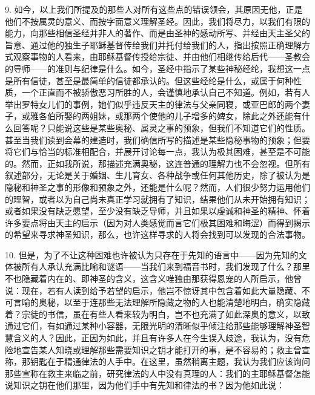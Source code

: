 9. 如今，以上我们所提及的那些人对所有这些点的错误领会，其原因无他，正是他们不按属灵的意义、而按字面意义理解圣经。因此，我们将尽力，以我们有限的能力，向那些相信圣经并非人的著作、而是由圣神的感动所写、并经由天主圣父的旨意、通过他的独生子耶稣基督传给我们并托付给我们的人，指出按照正确理解方式观察事物的人看来，由耶稣基督传授给宗徒、并由他们相继传给后代——圣教会的导师——的准则与纪律是什么。如今，圣经中指示了某些神秘经纶，我想这一点是所有信徒，甚至是最简单的信徒都承认的。但这些经纶是什么，或属于何种性质，一个正直而不被骄傲恶习所胜的人，会谨慎地承认自己不知道。例如，若有人举出罗特女儿们的事例，她们似乎违反天主的律法与父亲同寝，或亚巴郎的两个妻子，或雅各伯所娶的两姐妹，或那两个使他的儿子增多的婢女，除此之外还能有什么回答呢？只能说这些是某些奥秘、属灵之事的预象，但我们不知道它们的性质。甚至当我们读到会幕的建造时，我们确信所写的描述是某些隐秘事物的预象；但要将它们与恰当的标准相配合，并展开讨论每一点，我认为极其困难，甚至是不可能的。然而，正如我所说，那描述充满奥秘，这连普通的理解力也不会忽视。但所有叙述部分，无论是关于婚姻、生儿育女、各种战争或任何其他历史，除了被认为是隐秘和神圣之事的形像和预象之外，还能是什么呢？然而，人们很少努力运用他们的理智，或者以为自己尚未真正学习就拥有了知识，结果他们从未开始拥有知识；或者如果没有缺乏愿望，至少没有缺乏导师，并且如果以虔诚和神圣的精神、怀着许多要点将由天主的启示（因为对人类感觉而言它们极其困难和晦涩）而得到揭示的希望来寻求神圣知识，那么，也许这样寻求的人将会找到可以发现的合法事物。\par

10. 但是，为了不让这种困难也许被认为只存在于先知的语言中——因为先知的文体被所有人承认充满比喻和谜语——当我们来到福音书时，我们发现了什么？那里不也隐藏着内在的、即神圣的含义，这含义唯独由那获得恩宠的人所启示，他曾说：现在，若有人读到给予若望的启示，他岂不惊讶其中包含着如此大量隐藏、不可言喻的奥秘，以至于连那些无法理解所隐藏之物的人也能清楚地明白，确实隐藏着？宗徒的书信，虽在有些人看来较为明白，岂不也充满了如此深奥的意义，以致通过它们，有如通过某种小容器，无限光明的清晰似乎倾注给那些能够理解神圣智慧含义的人？因此，正因为如此，并且有许多人在今生误入歧途，我认为，没有危险地宣告某人知晓或理解那些需要知识之钥才能打开的事，是不容易的；救主曾宣称，那钥匙在于精通律法的人手中。在这里，虽然稍离主题，我认为我们应该询问那些宣称在救主来临之前，研究律法的人中没有真理的人：我们的主耶稣基督怎能说知识之钥在他们那里，因为他们手中有先知和律法的书？因为他如此说：\par

